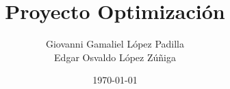 \title{\textbf{Proyecto Optimización}}
\date{\today}
\author{ Giovanni Gamaliel López Padilla\\Edgar Osvaldo López Zúñiga}
